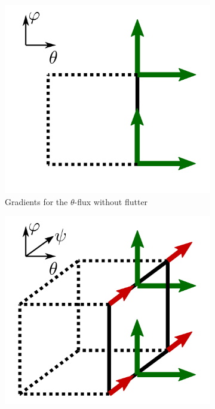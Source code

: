 \begin{figure}[!h]\centering
	\begin{subfigure}[t]{0.32\textwidth}
		\centering
		\includegraphics[width=\textwidth]{schemes/Gunter2D.png}
		\caption{ Gradients for the $\theta$-flux without flutter}
		\label{fig:Gunter2D} 
	\end{subfigure}
	\begin{subfigure}[t]{0.32\textwidth}
		\centering
		\includegraphics[width=\textwidth]{schemes/Gunter3D_theta.png}

\end{subfigure}
\end{figure}
